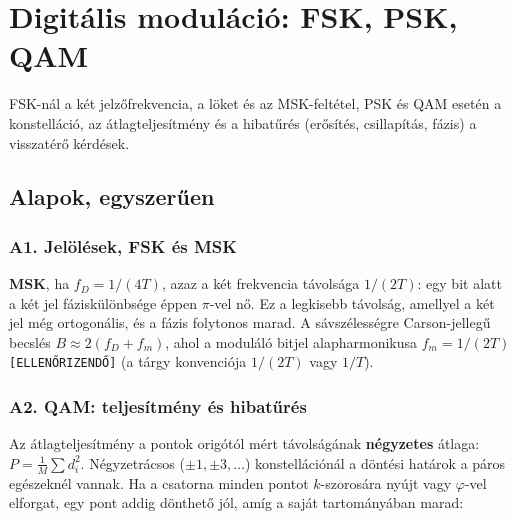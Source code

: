 \setcounter{chapter}{6}
\chapter{\texorpdfstring{Digitális moduláció: FSK, PSK, QAM}{Digitális moduláció: FSK, PSK, QAM}}\label{f7}
FSK-nál a két jelzőfrekvencia, a löket és az MSK-feltétel, PSK és QAM esetén a konstelláció, az átlagteljesítmény és a hibatűrés (erősítés, csillapítás, fázis) a visszatérő kérdések.

\section{Alapok, egyszerűen}
\subsection{\texorpdfstring{A1. Jelölések, FSK és MSK}{A1. Jelölések, FSK és MSK}}\label{a7-fsk}
\par{}\par

\textbf{MSK}, ha $f_D=1/(4T)$, azaz a két frekvencia távolsága $1/(2T)$: egy bit alatt a két jel fáziskülönbsége éppen $\pi$-vel nő. Ez a legkisebb távolság, amellyel a két jel még ortogonális, és a fázis folytonos marad. A sávszélességre Carson-jellegű becslés $B\approx2(f_D+f_m)$, ahol a moduláló bitjel alapharmonikusa $f_m=1/(2T)$ \texttt{[ELLENŐRIZENDŐ]} (a tárgy konvenciója $1/(2T)$ vagy $1/T$).

\subsection{\texorpdfstring{A2. QAM: teljesítmény és hibatűrés}{A2. QAM: teljesítmény és hibatűrés}}\label{a7-qam}
Az átlagteljesítmény a pontok origótól mért távolságának \textbf{négyzetes} átlaga: $P=\frac1M\sum d_i^2$. Négyzetrácsos ($\pm1,\pm3,\ldots$) konstellációnál a döntési határok a páros egészeknél vannak. Ha a csatorna minden pontot $k$-szorosára nyújt vagy $\varphi$-vel elforgat, egy pont addig dönthető jól, amíg a saját tartományában marad:

